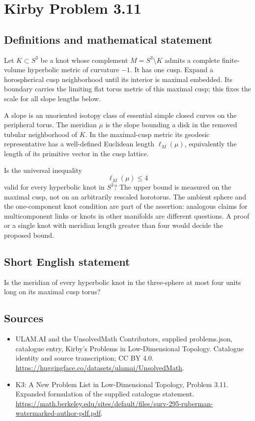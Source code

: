 \documentclass[11pt,a4paper]{article}
\begin{document}
\section*{Kirby Problem 3.11}\label{statement}

\subsection{Definitions and mathematical statement}
Let $K\subset S^3$ be a knot whose complement $M=S^3\setminus K$ admits
a complete finite-volume hyperbolic metric of curvature $-1$. It has one cusp.
Expand a horospherical cusp neighborhood until its interior is maximal embedded.
Its boundary carries the limiting flat torus metric of this maximal cusp;
this fixes the scale for all slope lengths below.

A slope is an unoriented isotopy class of essential simple closed curves on
the peripheral torus. The meridian $\mu$ is the slope bounding a disk in the
removed tubular neighborhood of $K$. In the maximal-cusp metric its geodesic
representative has a well-defined Euclidean length $\ell_M(\mu)$, equivalently
the length of its primitive vector in the cusp lattice.

Is the universal inequality
\[
 \ell_M(\mu)\leq4
\]
valid for every hyperbolic knot in $S^3$? The upper bound is measured on the
maximal cusp, not on an arbitrarily rescaled horotorus. The ambient sphere
and the one-component knot condition are part of the assertion: analogous
claims for multicomponent links or knots in other manifolds are different
questions. A proof or a single knot with meridian length greater than four
would decide the proposed bound.
\subsection{Short English statement}
Is the meridian of every hyperbolic knot in the three-sphere at most four units long on its maximal cusp torus?
\subsection{Sources}
\begin{itemize}
\item[S1] ULAM.AI and the UnsolvedMath Contributors, supplied problems.json, catalogue entry, Kirby's Problems in Low-Dimensional Topology. Catalogue identity and source transcription; CC BY 4.0.
\url{https://huggingface.co/datasets/ulamai/UnsolvedMath}.
\item[S2] K3: A New Problem List in Low-Dimensional Topology, Problem 3.11. Expanded formulation of the supplied catalogue statement.
\url{https://math.berkeley.edu/sites/default/files/surv-295-ruberman-watermarked-author-pdf.pdf}.
\end{itemize}
\end{document}
